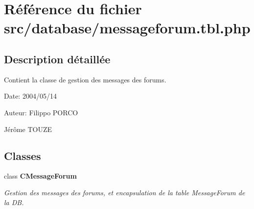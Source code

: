 \section{Référence du fichier src/database/messageforum.tbl.php}
\label{messageforum_8tbl_8php}


\subsection{Description détaillée}
Contient la classe de gestion des messages des forums. 

\begin{Desc}
\item[Date:]2004/05/14\end{Desc}
\begin{Desc}
\item[Auteur:]Filippo PORCO 

Jérôme TOUZE \end{Desc}


\subsection*{Classes}
\begin{CompactItemize}
\item 
class {\bf CMessageForum}
\begin{CompactList}\small\item\em Gestion des messages des forums, et encapsulation de la table MessageForum de la DB. \item\end{CompactList}\end{CompactItemize}
